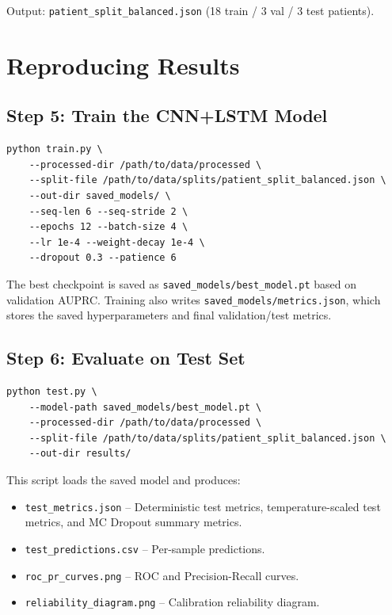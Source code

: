 \documentclass[11pt]{article}
\begin{document}
Output: \texttt{patient\_split\_balanced.json} (18 train / 3 val / 3 test patients).

\section{Reproducing Results}

\subsection{Step 5: Train the CNN+LSTM Model}

\begin{verbatim}
python train.py \
    --processed-dir /path/to/data/processed \
    --split-file /path/to/data/splits/patient_split_balanced.json \
    --out-dir saved_models/ \
    --seq-len 6 --seq-stride 2 \
    --epochs 12 --batch-size 4 \
    --lr 1e-4 --weight-decay 1e-4 \
    --dropout 0.3 --patience 6
\end{verbatim}

The best checkpoint is saved as \texttt{saved\_models/best\_model.pt} based on validation AUPRC.
Training also writes \texttt{saved\_models/metrics.json}, which stores the saved hyperparameters and final validation/test metrics.

\subsection{Step 6: Evaluate on Test Set}

\begin{verbatim}
python test.py \
    --model-path saved_models/best_model.pt \
    --processed-dir /path/to/data/processed \
    --split-file /path/to/data/splits/patient_split_balanced.json \
    --out-dir results/
\end{verbatim}

This script loads the saved model and produces:
\begin{itemize}[nosep]
    \item \texttt{test\_metrics.json} -- Deterministic test metrics, temperature-scaled test metrics, and MC Dropout summary metrics.
    \item \texttt{test\_predictions.csv} -- Per-sample predictions.
    \item \texttt{roc\_pr\_curves.png} -- ROC and Precision-Recall curves.
    \item \texttt{reliability\_diagram.png} -- Calibration reliability diagram.
\end{itemize}
\end{document}
